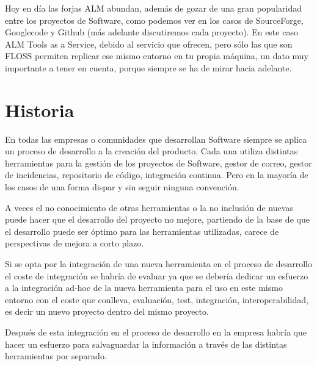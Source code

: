 \documentclass[11pt]{scrartcl}
\begin{document}
\par Hoy en d\'ia las forjas ALM abundan, adem\'as de gozar de una gran popularidad entre los proyectos de Software, como podemos ver en los casos de SourceForge, Googlecode y Github (más adelante discutiremos cada proyecto). En este caso ALM Tools as a Service, debido al servicio que ofrecen, pero sólo las que son FLOSS permiten replicar ese mismo entorno en tu propia máquina, un dato muy importante a tener en cuenta, porque siempre se ha de mirar hacia adelante.

\section{Historia}
\label{sec:historia}

\par En todas las empresas o comunidades que desarrollan Software siempre se aplica un proceso de desarrollo a la creación del producto. Cada una utiliza distintas herramientas para la gesti\'on de los proyectos de Software, gestor de correo, gestor de incidencias, repositorio de c\'odigo, integraci\'on continua. Pero en la mayor\'ia de los casos de una forma dispar y sin seguir ninguna convención.

\par A veces el no conocimiento de otras herramientas o la no inclusión de nuevas puede hacer que el desarrollo del proyecto no mejore, partiendo de la base de que el desarrollo puede ser óptimo para las herramientas utilizadas, carece de perspectivas de mejora a corto plazo.

\par Si se opta por la integración de una nueva herramienta en el proceso de desarrollo el coste de integración se habría de evaluar ya que se debería dedicar un esfuerzo a la integración ad-hoc de la nueva herramienta para el uso en este mismo entorno con el coste que conlleva, evaluación, test, integración, interoperabilidad, es decir un nuevo proyecto dentro del mismo proyecto.

\par Después de esta integración en el proceso de desarrollo en la empresa habría que hacer un esfuerzo para salvaguardar la información a través de las distintas herramientas por separado.
\end{document}

